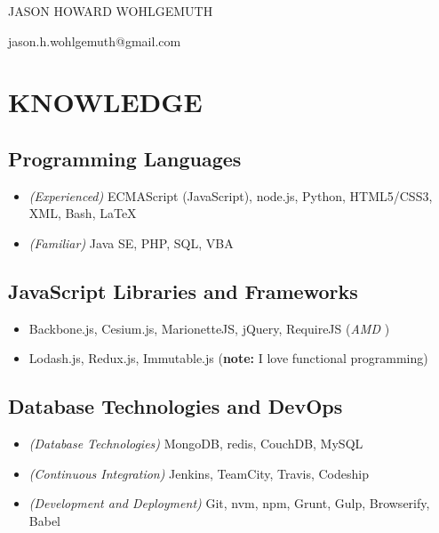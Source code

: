 \documentclass[10pt]{article}
\begin{document}
\begin{center}\Huge {JASON HOWARD WOHLGEMUTH}\end{center}
\begin{center}jason.h.wohlgemuth@gmail.com\end{center}

\section{KNOWLEDGE}\label{knowledge}

\subsection{Programming Languages}\label{programming-languages}

\begin{itemize}
\itemsep1pt\parskip0pt
\item
  \emph{(Experienced)} ECMAScript (JavaScript), node.js, Python,
  HTML5/CSS3, XML, Bash, LaTeX
\item
  \emph{(Familiar)} Java SE, PHP, SQL, VBA
\end{itemize}

\subsection{JavaScript Libraries and
Frameworks}\label{javascript-libraries-and-frameworks}

\begin{itemize}
\itemsep1pt\parskip0pt
\item
  Backbone.js, Cesium.js, MarionetteJS, jQuery, RequireJS (\emph{AMD })
\item
  Lodash.js, Redux.js, Immutable.js (\textbf{note:} I love functional
  programming)
\end{itemize}

\subsection{Database Technologies and
DevOps}\label{database-technologies-and-devops}

\begin{itemize}
\itemsep1pt\parskip0pt
\item
  \emph{(Database Technologies)} MongoDB, redis, CouchDB, MySQL
\item
  \emph{(Continuous Integration)} Jenkins, TeamCity, Travis, Codeship
\item
  \emph{(Development and Deployment)} Git, nvm, npm, Grunt, Gulp,
  Browserify, Babel
\end{itemize}
\end{document}
